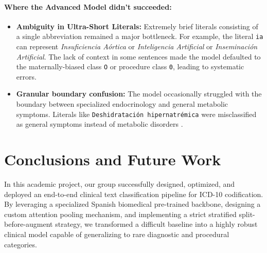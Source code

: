 \documentclass{article}
\begin{document}
\paragraph{Where the Advanced Model didn't succeeded:}
\begin{itemize}
    \item \textbf{Ambiguity in Ultra-Short Literals:} Extremely brief literals consisting of a single abbreviation remained a major bottleneck. For example, the literal \texttt{ia} can represent \textit{Insuficiencia Aórtica} or \textit{Inteligencia Artificial} or \textit{Inseminación Artificial}. The lack of context in some sentences made the model defaulted to the maternally-biased class \texttt{O} or procedure class \texttt{0}, leading to systematic errors.
    
    \item \textbf{Granular boundary confusion:} The model occasionally struggled with the boundary between specialized endocrinology and general metabolic symptoms. Literals like \texttt{Deshidratación hipernatrémica} were misclassified as general symptoms instead of metabolic disorders .
\end{itemize}


\section{Conclusions and Future Work}
In this academic project, our group successfully designed, optimized, and deployed an end-to-end clinical text classification pipeline for ICD-10 codification. By leveraging a specialized Spanish biomedical pre-trained backbone, designing a custom attention pooling mechanism, and implementing a strict stratified split-before-augment strategy, we transformed a difficult baseline into a highly robust clinical model capable of generalizing to rare diagnostic and procedural categories.
\end{document}
